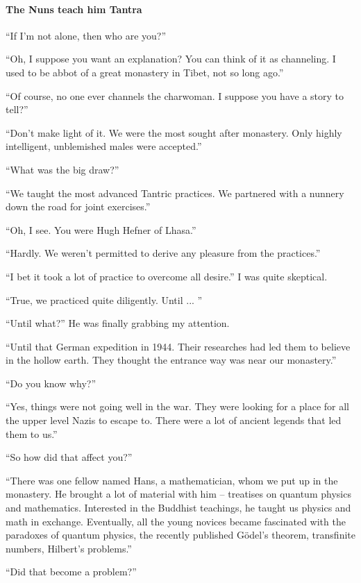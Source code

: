 \paragraph{The Nuns teach him Tantra}

``If I'm not alone, then who are you?''

``Oh, I suppose you want an explanation? You can think of it as channeling. I used to be abbot of a great monastery in Tibet, not so long ago.''

``Of course, no one ever channels the charwoman. I suppose you have a story to tell?''

``Don't make light of it. We were the most sought after monastery. Only highly intelligent, unblemished males were accepted.''

``What was the big draw?''

``We taught the most advanced Tantric practices. We partnered with a nunnery down the road for joint exercises.''

``Oh, I see. You were Hugh Hefner of Lhasa.''

``Hardly. We weren't permitted to derive any pleasure from the practices.''

``I bet it took a lot of practice to overcome all desire.'' I was quite skeptical.

``True, we practiced quite diligently. Until ... ''

``Until what?'' He was finally grabbing my attention.

``Until that German expedition in 1944. Their researches had led them to believe in the hollow earth. They thought the entrance way was near our monastery.''

``Do you know why?''

``Yes, things were not going well in the war. They were looking for a place for all the upper level Nazis to escape to. There were a lot of ancient legends that led them to us.''

``So how did that affect you?''

``There was one fellow named Hans, a mathematician, whom we put up in the monastery. He brought a lot of material with him -- treatises on quantum physics and mathematics. Interested in the Buddhist teachings, he taught us physics and math in exchange. Eventually, all the young novices became fascinated with the paradoxes of quantum physics, the recently published Gödel's theorem, transfinite numbers, Hilbert's problems.''

``Did that become a problem?''


